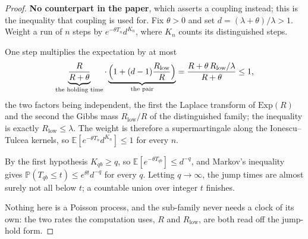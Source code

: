 \begin{proof}
  \leanok
  \textbf{No counterpart in the paper}, which asserts a coupling instead; this is
  the inequality that coupling is used for.  Fix $\theta > 0$ and set
  $d = (\lambda + \theta)/\lambda > 1$.  Weight a run of $n$ steps by
  $e^{-\theta T_n} d^{K_n}$, where $K_n$ counts its distinguished steps.

  One step multiplies the expectation by at most
  \[
    \underbrace{\frac{R}{R+\theta}}_{\text{the holding time}}
    \cdot
    \underbrace{\Bigl(1 + (d-1)\frac{R_{\mathrm{low}}}{R}\Bigr)}_{\text{the pair}}
    = \frac{R + \theta\,R_{\mathrm{low}}/\lambda}{R+\theta} \le 1 ,
  \]
  the two factors being independent, the first the Laplace transform of
  $\mathrm{Exp}(R)$ and the second the Gibbs mass $R_{\mathrm{low}}/R$ of the
  distinguished family; the inequality is exactly $R_{\mathrm{low}} \le \lambda$.  The
  weight is therefore a supermartingale along the Ionescu--Tulcea kernels, so
  $\mathbb{E}[e^{-\theta T_n} d^{K_n}] \le 1$ for every $n$.

  By the first hypothesis $K_{qb} \ge q$, so $\mathbb{E}[e^{-\theta T_{qb}}] \le
  d^{-q}$, and Markov's inequality gives $\mathbb{P}(T_{qb} \le t) \le e^{\theta
  t} d^{-q}$ for every $q$.  Letting $q \to \infty$, the jump times are almost
  surely not all below $t$; a countable union over integer $t$ finishes.

  Nothing here is a Poisson process, and the sub-family never needs a clock of its
  own: the two rates the computation uses, $R$ and $R_{\mathrm{low}}$, are both read off
  the jump-hold form.
\end{proof}

